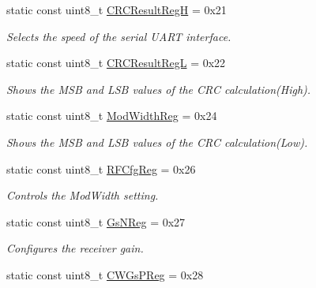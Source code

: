 \begin{DoxyCompactItemize}
static const uint8\+\_\+t \hyperlink{classMFRC522_ac1d563b996ba0cdf5f94dee272454b4c}{C\+R\+C\+Result\+RegH} = 0x21
\begin{DoxyCompactList}\small\item\em Selects the speed of the serial U\+A\+RT interface. \end{DoxyCompactList}\item 
\mbox{\label{classMFRC522_aac4ba530ce3dc672d22e1840022c8dbf}} 
static const uint8\+\_\+t \hyperlink{classMFRC522_aac4ba530ce3dc672d22e1840022c8dbf}{C\+R\+C\+Result\+RegL} = 0x22
\begin{DoxyCompactList}\small\item\em Shows the M\+SB and L\+SB values of the C\+RC calculation(\+High). \end{DoxyCompactList}\item 
\mbox{\label{classMFRC522_a8f8491e3696a212253204e0a4d50b460}} 
static const uint8\+\_\+t \hyperlink{classMFRC522_a8f8491e3696a212253204e0a4d50b460}{Mod\+Width\+Reg} = 0x24
\begin{DoxyCompactList}\small\item\em Shows the M\+SB and L\+SB values of the C\+RC calculation(\+Low). \end{DoxyCompactList}\item 
\mbox{\label{classMFRC522_a6247cc38cc52524eb30d94a9e745811e}} 
static const uint8\+\_\+t \hyperlink{classMFRC522_a6247cc38cc52524eb30d94a9e745811e}{R\+F\+Cfg\+Reg} = 0x26
\begin{DoxyCompactList}\small\item\em Controls the Mod\+Width setting. \end{DoxyCompactList}\item 
\mbox{\label{classMFRC522_a91ddbaf4e4bc33dd43a7599238e9f9a1}} 
static const uint8\+\_\+t \hyperlink{classMFRC522_a91ddbaf4e4bc33dd43a7599238e9f9a1}{Gs\+N\+Reg} = 0x27
\begin{DoxyCompactList}\small\item\em Configures the receiver gain. \end{DoxyCompactList}\item 
\mbox{\label{classMFRC522_ae9dab4aef1658240f8ea032496311c69}} 
static const uint8\+\_\+t \hyperlink{classMFRC522_ae9dab4aef1658240f8ea032496311c69}{C\+W\+Gs\+P\+Reg} = 0x28

\end{DoxyCompactItemize}
